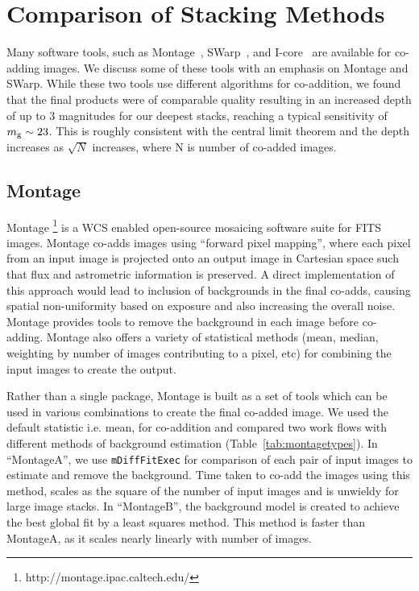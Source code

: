 \documentclass[fleqn,usenatbib]{mnras}
\begin{document}
\section{Comparison of Stacking Methods}\label{sec:methods}

Many software tools, such as Montage~\citep{mont},
SWarp~\citep{Bertin1996,swarp}, and
I-core~\citep{icoreref,icoreref2}
are available for co-adding images.
We discuss some of these tools with an emphasis on Montage and
SWarp. While these two tools use different algorithms for co-addition, we found
that the final products were of comparable quality resulting in an increased depth of up to 3 magnitudes for our deepest stacks, reaching a typical sensitivity of $m_{\rm g} \sim 23$. This is roughly consistent with the central limit theorem and the depth increases as $\sqrt{N}$ increases, where N is number of co-added images.

\subsection{Montage}\label{subsec:montage}
Montage \citep{mont}\footnote{http://montage.ipac.caltech.edu/} is a WCS enabled open-source mosaicing software suite for FITS images. Montage co-adds images using ``forward pixel mapping'', where each pixel from an input image is projected onto an output image in Cartesian space such that flux and astrometric information is preserved. A direct implementation of this approach would lead to inclusion of backgrounds in the final co-adds, causing spatial non-uniformity based on exposure and also increasing the overall noise. Montage provides tools to remove the background in each image before co-adding. Montage also offers a variety of statistical methods (mean, median, weighting by number of images contributing to a pixel, etc) for combining the input images to create the output.

Rather than a single package, Montage is built as a set of tools which can be used in various combinations to create the final co-added image. We used the default statistic i.e. mean, for co-addition and compared two work flows with different methods of background estimation (Table~\ref{tab:montagetypes}). In ``MontageA'',  we use \texttt{mDiffFitExec} for comparison of each pair of input images to estimate and remove the background. Time taken to co-add the images using this method, scales as the square of the number of input images and is unwieldy for large image stacks. In ``MontageB'', the background model is created to achieve the best global fit by a least squares method. This method is faster than MontageA, as it scales nearly linearly with number of images.
\end{document}
